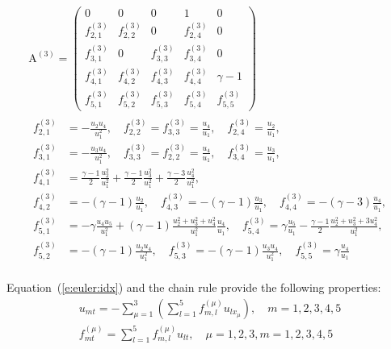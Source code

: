 \documentclass{turgon}
\begin{document}
\begin{gather}
  \begin{gathered}
    \mathrm{A}^{(3)} = \left(
    \begin{array}{ccccc}
      0             & 0             & 0             & 1             & 0 \\
      f^{(3)}_{2,1} & f^{(3)}_{2,2} & 0             & f^{(3)}_{2,4} & 0 \\
      f^{(3)}_{3,1} & 0             & f^{(3)}_{3,3} & f^{(3)}_{3,4} & 0 \\
      f^{(3)}_{4,1} & f^{(3)}_{4,2} & f^{(3)}_{4,3} & f^{(3)}_{4,4} &
      \gamma - 1 \\
      f^{(3)}_{5,1} & f^{(3)}_{5,2} & f^{(3)}_{5,3} & f^{(3)}_{5,4} &
      f^{(3)}_{5,5}
    \end{array}
    \right)
    \\
    \begin{aligned}
      f^{(3)}_{2,1} &= -\frac{u_2 u_4}{u_1^2}, \quad
      f^{(3)}_{2,2} = f^{(3)}_{3,3} = \frac{u_4}{u_1}, \quad
      f^{(3)}_{2,4} = \frac{u_2}{u_1}, \\
      f^{(3)}_{3,1} &= -\frac{u_3 u_4}{u_1^2}, \quad
      f^{(3)}_{3,3} = f^{(3)}_{2,2} = \frac{u_4}{u_1}, \quad
      f^{(3)}_{3,4} = \frac{u_3}{u_1}, \\
      f^{(3)}_{4,1} &= \frac{\gamma-1}{2}\frac{u_2^2}{u_1^2}
      + \frac{\gamma-1}{2}\frac{u_3^2}{u_1^2}
      + \frac{\gamma-3}{2}\frac{u_4^2}{u_1^2}, \\
      f^{(3)}_{4,2} &= -(\gamma-1)\frac{u_2}{u_1}, \quad
      f^{(3)}_{4,3} = -(\gamma-1)\frac{u_3}{u_1}, \quad
      f^{(3)}_{4,4} = -(\gamma-3)\frac{u_4}{u_1}, \\
      f^{(3)}_{5,1} &= -\gamma\frac{u_4 u_5}{u_1^2}
      + (\gamma-1)\frac{u_2^2+u_3^2+u_4^2}{u_1^2}\frac{u_4}{u_1}, \quad
      f^{(3)}_{5,4} = \gamma\frac{u_5}{u_1}
      - \frac{\gamma-1}{2}\frac{u_2^2 + u_3^2 + 3u_4^2}{u_1^2}, \\
      f^{(3)}_{5,2} &= -(\gamma-1)\frac{u_2 u_4}{u_1^2}, \quad
      f^{(3)}_{5,3} = -(\gamma-1)\frac{u_3 u_4}{u_1^2}, \quad
      f^{(3)}_{5,5} = \gamma\frac{u_4}{u_1}
    \end{aligned}
  \end{gathered}
  \label{e:euler:jaco1}
\end{gather}

Equation~(\ref{e:euler:idx}) and the chain rule provide the following
properties:
%
\begin{gather}
  u_{mt} =
  -\sum_{\mu=1}^3
  \left(
  \sum_{l=1}^5 f^{(\mu)}_{m,l} u_{lx_{\mu}}
  \right),
  \quad m = 1, 2, 3, 4, 5
  \label{e:euler:ut}
  \\
  f^{(\mu)}_{mt} =
  \sum_{l=1}^5 f^{(\mu)}_{m,l} u_{lt},
  \quad \mu = 1, 2, 3, m = 1, 2, 3, 4, 5
  \label{e:euler:ft}
\end{gather}
\end{document}
